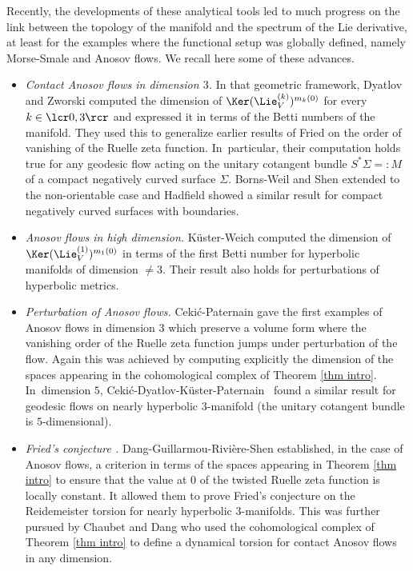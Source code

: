 Recently, the developments of these analytical tools led to much progress on the link between the topology of the manifold and the spectrum of the Lie derivative, at least for the examples where the functional setup was globally defined, namely Morse-Smale and Anosov flows. We recall here some of these advances.
\begin{itemize}
\item \emph{Contact Anosov flows in dimension $3$.} In that geometric framework, Dyatlov and Zworski \cite{dyatlov-zworski_2017} computed the dimension of $\Ker (\Lie_V^{(k)})^{m_k(0)}$ for every $k\in\lcr0,3\rcr$ and expressed it in terms of the Betti numbers of the manifold. They used this to generalize earlier results of Fried \cite{fried_lefschetz} on the order of vanishing of the Ruelle zeta function. In~particular, their computation holds true for any geodesic flow acting on the unitary cotangent bundle $S^*\Sigma =: M$ of a compact negatively curved surface $\Sigma$. Borns-Weil and Shen \cite{borns-weil-shen} extended \cite{dyatlov-zworski_2017} to the non-orientable case and Hadfield \cite{hadfield} showed a similar result for compact negatively curved surfaces with boundaries.
\item \emph{Anosov flows in high dimension.} Küster-Weich \cite{kuster-weich} computed the dimension of $\Ker (\Lie_V^{(1)})^{m_1(0)}$ in terms of the first Betti number for hyperbolic manifolds of dimension $\neq 3$. Their result also holds for perturbations of hyperbolic metrics.
\item \emph{Perturbation of Anosov flows.} Ceki\'{c}-Paternain \cite{cekic-paternain} gave the first examples of Anosov flows in dimension $3$ which preserve a volume form where the vanishing order of the Ruelle zeta function jumps under perturbation of the flow. Again this was achieved by computing explicitly the dimension of the spaces appearing in the cohomological complex of Theorem \ref{thm intro}. In~dimension $5$, Ceki\'{c}-Dyatlov-Küster-Paternain~\cite{CDKP} found a similar result for geodesic flows on nearly hyperbolic $3$-manifold (the unitary cotangent bundle is $5$-dimensional).
\item \emph{Fried's conjecture \cite{fried_lefschetz,fried_meromorphic}.} Dang-Guillarmou-Rivière-Shen \cite{DGRS} established, in the case of Anosov flows, a criterion in terms of the spaces appearing in Theorem \ref{thm intro} to ensure that the value at $0$ of the twisted Ruelle zeta function is locally constant. It allowed them to prove Fried's conjecture on the Reidemeister torsion for nearly hyperbolic $3$-manifolds. This was further pursued by Chaubet and Dang \cite{chaubet-dang} who used the cohomological complex of Theorem \ref{thm intro} to define a dynamical torsion for contact Anosov flows in any dimension.

\end{itemize}
